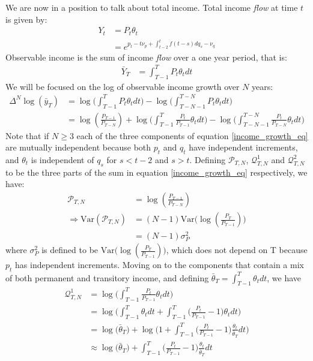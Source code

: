 We are now in a position to talk about total income. Total income \textit{flow} at time $t$ is given by:
\begin{align*}
Y_t &= P_t \theta_t \\
&= e^{p_t - t\nu_p + \int_{t-2}^{t} f(t-s)dq_s -\nu_q}
\end{align*}
Observable income is the sum of income \textit{flow} over a one year period, that is:
\begin{align*}
\bar{Y}_T &= \int_{T-1}^{T}P_t \theta_t dt 
\end{align*}
We will be focused on the log of observable income growth over $N$ years:
\begin{align}
\Delta^N\log(\bar{y}_T) &= \log\Big(\int_{T-1}^{T}P_t \theta_t dt \Big) - \log\Big(\int_{T-N-1}^{T-N}P_t \theta_t dt \Big) \nonumber \\
&= \log(\frac{P_{T-1}}{P_{T-N}})  + \log \Bigg(  \int_{T-1}^{T} \frac{P_t}{P_{T-1}} \theta_t dt\Bigg)  - \log \Bigg(  \int_{T-N-1}^{T-N}  \frac{P_t}{P_{T-N}} \theta_t  dt\Bigg) \label{income_growth_eq}
\end{align}
Note that if $N\geq3$ each of the three components of equation \ref{income_growth_eq} are mutually independent because both $p_t$ and $q_t$ have independent increments, and $\theta_t$ is independent of $q_s$ for $s<t-2$ and $s>t$. Defining $\mathcal{P}_{T,N}$, $\mathcal{Q}^1_{T,N}$ and $\mathcal{Q}^2_{T,N}$ to be the three parts of the sum in equation \ref{income_growth_eq} respectively, we have:
\begin{align*}
\mathcal{P}_{T,N} &= \log(\frac{P_{T-1}}{P_{T-N}}) \\
\Rightarrow \mathrm{Var}(\mathcal{P}_{T,N}) &= (N-1)\mathrm{Var}\Big(\log(\frac{P_{T}}{P_{T-1}})\Big) \\
&= (N-1)\sigma^2_P
\end{align*}
where $\sigma^2_P$ is defined to be $\mathrm{Var}\Big(\log(\frac{P_{T}}{P_{T-1}})\Big)$, which does not depend on T because $p_t$ has independent increments.
Moving on to the components that contain a mix of both permanent and transitory income, and defining $\bar{\theta}_T=\int_{T-1}^{T}\theta_t dt$, we have
\begin{align*}
\mathcal{Q}^1_{T,N} &= \log \Bigg(  \int_{T-1}^{T} \frac{P_t}{P_{T-1}} \theta_t dt\Bigg) \\
&= \log \Bigg(\int_{T-1}^{T}  \theta_t dt  +   \int_{T-1}^{T} \Big(\frac{P_t}{P_{T-1}}-1\Big)\theta_t dt\Bigg) \\
&= \log \Big(\bar{\theta}_T \Big) + \log \Bigg( 1+ \int_{T-1}^{T} \Big(\frac{P_t}{P_{T-1}}-1\Big)\frac{\theta_t}{\bar{\theta}_T} dt\Bigg) \\
&\approx \log \Big(\bar{\theta}_T \Big) + \int_{T-1}^{T} \Big(\frac{P_t}{P_{T-1}}-1\Big)\frac{\theta_t}{\bar{\theta}_T} dt
\end{align*}
